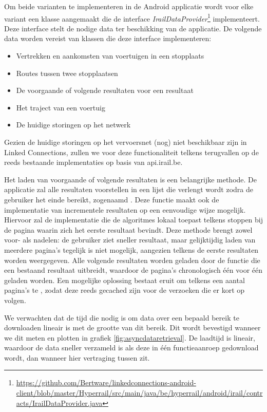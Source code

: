 Om beide varianten te implementeren in de Android applicatie wordt voor elke variant een klasse aangemaakt die de interface \emph{IrailDataProvider}\footnote{\url{https://github.com/Bertware/linkedconnections-android-client/blob/master/Hyperrail/src/main/java/be/hyperrail/android/irail/contracts/IrailDataProvider.java}} implementeert. Deze interface stelt de nodige data ter beschikking van de applicatie. De volgende data worden vereist van klassen die deze interface implementeren:

\begin{itemize}
	\item Vertrekken en aankomsten van voertuigen in een stopplaats
	\item Routes tussen twee stopplaatsen
	\item De voorgaande of volgende resultaten voor een resultaat
	\item Het traject van een voertuig
	\item De huidige storingen op het netwerk
\end{itemize}

Gezien de huidige storingen op het vervoersnet (nog) niet beschikbaar zijn in Linked Connections, zullen we voor deze functionaliteit telkens terugvallen op de reeds bestaande implementaties op basis van api.irail.be.

Het laden van voorgaande of volgende resultaten is een belangrijke methode. De applicatie zal alle resultaten voorstellen in een lijst die verlengt wordt zodra de gebruiker het einde bereikt, zogenaamd . Deze functie maakt ook de implementatie van incrementele resultaten op een eenvoudige wijze mogelijk. Hiervoor zal de implementatie die de algoritmes lokaal toepast telkens stoppen bij de pagina waarin zich het eerste resultaat bevindt. Deze methode brengt zowel voor- als nadelen: de gebruiker ziet sneller resultaat, maar gelijktijdig laden van meerdere pagina's tegelijk is niet mogelijk, aangezien telkens de eerste resultaten worden weergegeven. Alle volgende resultaten worden geladen door de functie die een bestaand resultaat uitbreidt, waardoor de pagina's chronologisch één voor één geladen worden. Een mogelijke oplossing bestaat eruit om telkens een aantal pagina's te , zodat deze reeds gecached zijn voor de verzoeken die er kort op volgen.

We verwachten dat de tijd die nodig is om data over een bepaald bereik te downloaden lineair is met de grootte van dit bereik. Dit wordt bevestigd wanneer we dit meten en plotten in grafiek \ref{fig:asyncdataretrieval}. De laadtijd is lineair, waardoor de data sneller verzameld is als deze in één functieaanroep gedownload wordt, dan wanneer hier vertraging tussen zit.

